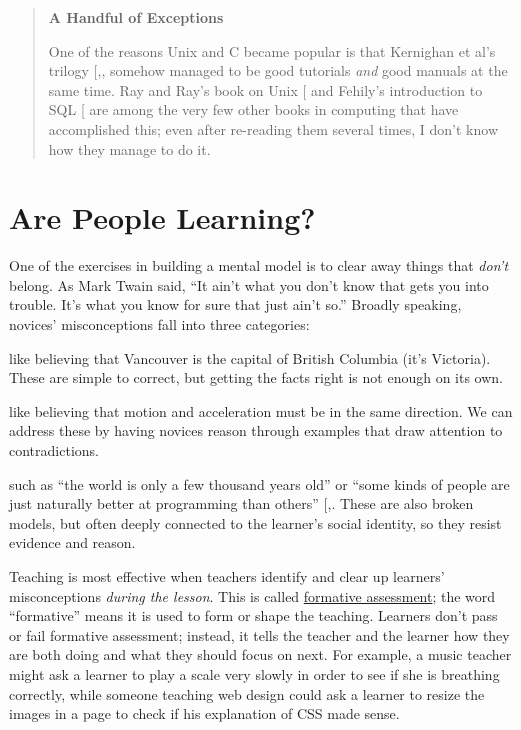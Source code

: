 \begin{quote}\setlength{\parindent}{0pt}
\textbf{A Handful of Exceptions}

One of the reasons Unix and C became popular is that Kernighan et
al's trilogy {[},,\protect[\hyperlink{b:Kern1988}{Kern1988}]{]}
somehow managed to be good tutorials \emph{and} good manuals at the same
time. Ray and Ray's book on Unix {[}\protect[\hyperlink{b:Ray2014}{Ray2014}]{]} and Fehily's
introduction to SQL {[}\protect[\hyperlink{b:Fehi2008}{Fehi2008}]{]} are among the very few other
books in computing that have accomplished this; even after
re-reading them several times, I don't know how they manage to do
it.
\end{quote}

\section{Are People Learning?}\label{s:models-formative-assessment}

One of the exercises in building a mental model is to clear away things
that \emph{don't} belong. As Mark Twain said, ``It ain't what you don't know
that gets you into trouble. It's what you know for sure that just ain't
so.'' Broadly speaking, novices' misconceptions fall into three
categories:

\begin{description}
\tightlist
\item[Factual errors]
like believing that Vancouver is the capital of British Columbia
(it's Victoria). These are simple to correct, but getting the
facts right is not enough on its own.
\item[Broken models]
like believing that motion and acceleration must be in the same
direction. We can address these by having novices reason through
examples that draw attention to contradictions.
\item[Fundamental beliefs]
such as ``the world is only a few thousand years old'' or ``some kinds
of people are just naturally better at programming than others''
{[},\protect[\hyperlink{b:Pati2016}{Pati2016}]{]}. These are also broken models, but
often deeply connected to the learner's social identity, so they
resist evidence and reason.
\end{description}

Teaching is most effective when teachers identify and clear up learners'
misconceptions \emph{during the lesson}. This is called
\protect\hyperlink{g:formative-assessment}{formative assessment}; the word
``formative'' means it is used to form or shape the teaching. Learners
don't pass or fail formative assessment; instead, it tells the teacher
and the learner how they are both doing and what they should focus on
next. For example, a music teacher might ask a learner to play a scale
very slowly in order to see if she is breathing correctly, while someone
teaching web design could ask a learner to resize the images in a page
to check if his explanation of CSS made sense.

